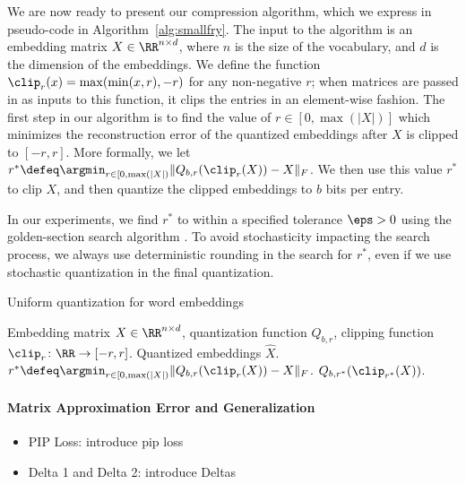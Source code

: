 We are now ready to present our compression algorithm, which we express in pseudo-code in Algorithm~\ref{alg:smallfry}.
The input to the algorithm is an embedding matrix $X \in \RR^{n\times d}$, where $n$ is the size of the vocabulary, and $d$ is the dimension of the embeddings.
We define the function $\clip_r(x) = \max(\min(x,r),-r)$ for any non-negative $r$; when matrices are passed in as inputs to this function, it clips the entries in an element-wise fashion.
The first step in our algorithm is to find the value of $r \in [0,\max(|X|)]$ which minimizes the reconstruction error of the quantized embeddings after $X$ is clipped to $[-r,r]$.
More formally, we let $r^* \defeq \argmin_{r \in [0,\max(|X|)} \|Q_{b,r}(\clip_r(X))-X\|_F$.
We then use this value $r^*$ to clip $X$, and then quantize the clipped embeddings to $b$ bits per entry.

In our experiments, we find $r^*$ to within a specified tolerance $\eps > 0$ using the golden-section search algorithm \citep{golden53}.
To avoid stochasticity impacting the search process, we always use deterministic rounding in the search for $r^*$, even if we use stochastic quantization in the final quantization.

\begin{algorithm}[tb]
   \caption{Uniform quantization for word embeddings}
   \label{alg:smallfry}
\begin{algorithmic}[1]
	  Embedding matrix $X \in \RR^{n \times d}$, quantization function $Q_{b,r}$, clipping function $\clip_r\colon\RR\rightarrow[-r,r]$.
	 Quantized embeddings $\hat{X}$.
	\STATE $r^* \defeq \argmin_{r \in [0,\max(|X|)} \|Q_{b,r}(\clip_r(X))-X\|_F$.
	 $Q_{b,r^*}(\clip_{r^*}(X))$.
\end{algorithmic}
\end{algorithm}



\paragraph{Matrix Approximation Error and Generalization}
	\begin{itemize}
		\item PIP Loss: introduce pip loss
		\item Delta 1 and Delta 2: introduce Deltas
	\end{itemize}
	
